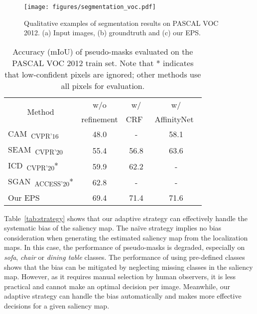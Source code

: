 \documentclass[final]{cvpr}
\begin{document}
    \begin{figure*}[t]
\centering
\texttt{[image: figures/segmentation\_voc.pdf]}
\caption{Qualitative examples of segmentation results on PASCAL VOC 2012. (a) Input images, (b) groundtruth and (c) our EPS.}\vspace{-2mm}
\label{fig:seg_qual_voc}
\end{figure*} \begin{table}[]
\centering
{\small
\begin{tabular}{@{}lccc@{}}
\toprule
\multicolumn{1}{c}{\multirow{2}{*}{Method}}         & w/o           & w/ &                                  w/ \\
                                                    & refinement    & CRF~\cite{krahenbuhl2011efficient}    & AffinityNet~\cite{ahn2018learning}    \\ \midrule
\multicolumn{1}{l}{CAM~\cite{zhou2016learning}\textsubscript{CVPR'16}}     & 48.0          & -                                     & 58.1                                  \\
\multicolumn{1}{l}{SEAM~\cite{wang2020self}\textsubscript{CVPR'20}}        & 55.4          & 56.8                                  & 63.6                                  \\
\multicolumn{1}{l}{ICD~\cite{chen2020boundary}\textsubscript{CVPR'20}*}     & 59.9          & 62.2                                  & -                                     \\
\multicolumn{1}{l}{SGAN~\cite{yao2020saliency}\textsubscript{ACCESS'20}*}     & 62.8          & -                                     & -                                     \\
\multicolumn{1}{l}{Our EPS}                            & 69.4          & 71.4                                  & 71.6                                  \\ \bottomrule
\end{tabular}
}
\vspace{2mm}
\caption{Accuracy (mIoU) of pseudo-masks evaluated on the PASCAL VOC 2012 train set. Note that * indicates that low-confident pixels are ignored; other methods use all pixels for evaluation.} \vspace{-3mm}
\label{tab:refinement}
\end{table} 
Table~\ref{tab:strategy} shows that our adaptive strategy can effectively handle the systematic bias of the saliency map. The na\"ive strategy implies no bias consideration when generating the estimated saliency map from the localization maps. In this case, the performance of pseudo-masks is degraded, especially on \emph{sofa}, \emph{chair} or \emph{dining table} classes. The performance of using pre-defined classes shows that the bias can be mitigated by neglecting missing classes in the saliency map. However, as it requires manual selection by human observers, it is less practical and cannot make an optimal decision per image. Meanwhile, our adaptive strategy can handle the bias automatically and makes more effective decisions for a given saliency map. 
\end{document}
